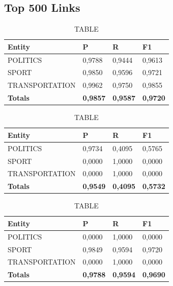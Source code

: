 \documentclass[thesis=M,english]{FITthesis}[2018/05/30]
\begin{document}

\subsection{Top 500 Links}


	\begin{table}[H]\centering
		\caption{TABLE}
		\label{}
		\begin{tabular}{|l|l|l|l|}
			\hline {\textbf{Entity}} & {\textbf{P}} & {\textbf{R}} & {\textbf{F1}}\\\hline
				POLITICS & 0,9788 & 0,9444 & 0,9613\\
				SPORT & 0,9850 & 0,9596 & 0,9721\\
				TRANSPORTATION & 0,9962 & 0,9750 & 0,9855\\\hline
				\textbf{Totals} & \textbf{0,9857} & \textbf{0,9587} & \textbf{0,9720}\\\hline
		\end{tabular}
	\end{table}

	\begin{table}[H]\centering
		\caption{TABLE}
		\label{}
		\begin{tabular}{|l|l|l|l|}
			\hline {\textbf{Entity}} & {\textbf{P}} & {\textbf{R}} & {\textbf{F1}}\\\hline
				POLITICS & 0,9734 & 0,4095 & 0,5765\\
				SPORT & 0,0000 & 1,0000 & 0,0000\\
				TRANSPORTATION & 0,0000 & 1,0000 & 0,0000\\\hline
				\textbf{Totals} & \textbf{0,9549} & \textbf{0,4095} & \textbf{0,5732}\\\hline
		\end{tabular}
	\end{table}

	\begin{table}[H]\centering
		\caption{TABLE}
		\label{}
		\begin{tabular}{|l|l|l|l|}
			\hline {\textbf{Entity}} & {\textbf{P}} & {\textbf{R}} & {\textbf{F1}}\\\hline
				POLITICS & 0,0000 & 1,0000 & 0,0000\\
				SPORT & 0,9849 & 0,9594 & 0,9720\\
				TRANSPORTATION & 0,0000 & 1,0000 & 0,0000\\\hline
				\textbf{Totals} & \textbf{0,9788} & \textbf{0,9594} & \textbf{0,9690}\\\hline
		\end{tabular}
	\end{table}	
\end{document}
